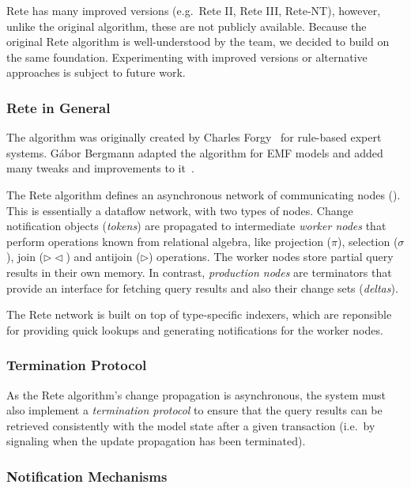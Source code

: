Rete has many improved versions (e.g.\ Rete II, Rete III, Rete-NT), however, unlike the original algorithm, these are not publicly available. Because the original Rete algorithm is well-understood by the \eiq{} team, we decided to build \iqd{} on the same foundation. Experimenting with improved versions or alternative approaches is subject to future work.

\subsubsection{Rete in General}

The algorithm was originally created by Charles Forgy~\cite{Forgy} for rule-based expert systems. Gábor Bergmann  adapted the algorithm for EMF models and added many tweaks and improvements to it~\cite{BergmannMasters}.


The Rete algorithm defines an asynchronous network of communicating nodes (). This is essentially a dataflow network, with two types of nodes. Change notification objects (\emph{tokens}) are propagated to intermediate \emph{worker nodes} that perform operations known from relational algebra, like projection ($ \pi $), selection ($ \sigma $),  join ($ \rhd\!\!\lhd $) and antijoin ($ \rhd $) operations. The worker nodes store partial query results in their own memory. In contrast, \emph{production nodes} are terminators that provide an interface for fetching query results and also their change sets (\emph{deltas}).

The Rete network is built on top of type-specific indexers, which are reponsible for providing quick lookups and generating notifications for the worker nodes.

\subsubsection{Termination Protocol}

As the Rete algorithm's change propagation is asynchronous, the system must also implement a \emph{termination protocol} to ensure that the query results can be retrieved consistently with the model state after a given transaction (i.e.\ by signaling when the update propagation has been terminated).

\subsubsection{Notification Mechanisms}
\label{notifications}

